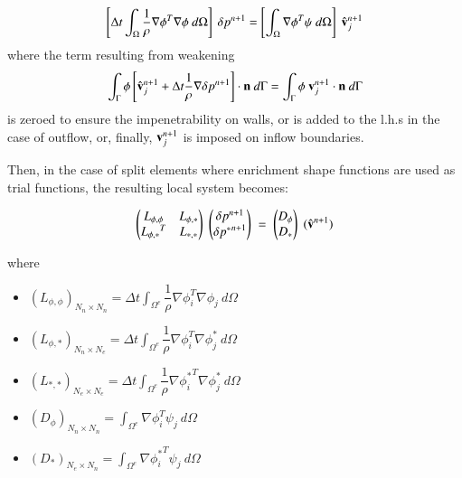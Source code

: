 \begin{equation}
   \left[\Delta t \int_{\Omega} \frac{1}{\rho} \nabla \phi^T \nabla \phi \ d\Omega\right]\ \delta p^{n+1} = \left[\int_{\Omega} \nabla \phi^T \psi \ d\Omega\right]\ \hat {\mathbf{v}}_j^{n+1}
\label{poisson}
\end{equation}
where the term resulting from weakening
\begin{equation}
\displaystyle \int_{\Gamma} \phi \left[ \hat {\mathbf{v}}_j^{n+1} + \Delta t \frac{1}{\rho} \nabla  \delta p^{n+1} \right] \cdot \mathbf{n} \ d\Gamma = \int_{\Gamma} \phi \ \mathbf{v}_j^{n+1} \cdot \mathbf{n} \ d\Gamma
\end{equation}
 is zeroed to ensure the impenetrability on walls, or is added to the l.h.s in the case of outflow, or, finally, $\mathbf{v}_j^{n+1}$ is imposed on inflow boundaries.

Then, in the case of split elements where enrichment shape functions are used as trial functions, the resulting local system becomes:

  \begin{equation}
  \label{eqsys-poisson}
   \begin{pmatrix}
      L_{\phi,\phi} & L_{\phi,*}\\
      {L_{\phi,*}}^T & L_{*,*}
   \end{pmatrix}\;
    \begin{pmatrix}
      \delta p^{n+1}\\
      \delta {p^*}^{n+1}
   \end{pmatrix}\; = \;
   \begin{pmatrix}
      D_{\phi}\\
      D_*
   \end{pmatrix}\;
   (\hat{\mathbf{v}}^{n+1})
\end{equation}

where
\begin{itemize}
 \item ${(L_{\phi,\phi})}_{N_n\times N_n} = \Delta t \displaystyle \int_{\Omega^e} \dfrac{1}{\rho} \nabla \phi_i^T \nabla \phi_j \ d\Omega$
 \item ${(L_{\phi,*})}_{N_n\times N_e} = \Delta t \displaystyle \int_{\Omega^e} \dfrac{1}{\rho} \nabla \phi_i^T \nabla \phi_j^* \ d\Omega$
 \item ${(L_{*,*})}_{N_e\times N_e} = \Delta t \displaystyle \int_{\Omega^e} \dfrac{1}{\rho} \nabla {\phi_i^*}^T \nabla \phi_j^* \ d\Omega$
 \item ${(D_{\phi})}_{N_n\times N_n} = \displaystyle \int_{\Omega^e} \nabla \phi_i^T \psi_j \ d\Omega$
 \item ${(D_*)}_{N_e\times N_n} = \displaystyle \int_{\Omega^e}  \nabla {\phi_i^*}^T \psi_j \ d\Omega$
\end{itemize}

